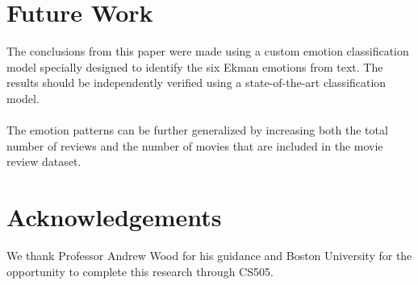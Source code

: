 \documentclass[11pt]{article}
\begin{document}
\section{Future Work}
The conclusions from this paper were made using a custom emotion classification model specially designed to identify the six Ekman emotions from text. The results should be independently verified using a state-of-the-art classification model. \\ \\
The emotion patterns can be further generalized by increasing both the total number of reviews and the number of movies that are included in the movie review dataset.
\section{Acknowledgements}
We thank Professor Andrew Wood for his guidance and Boston University for the opportunity to complete this research through CS505.

\end{document}
